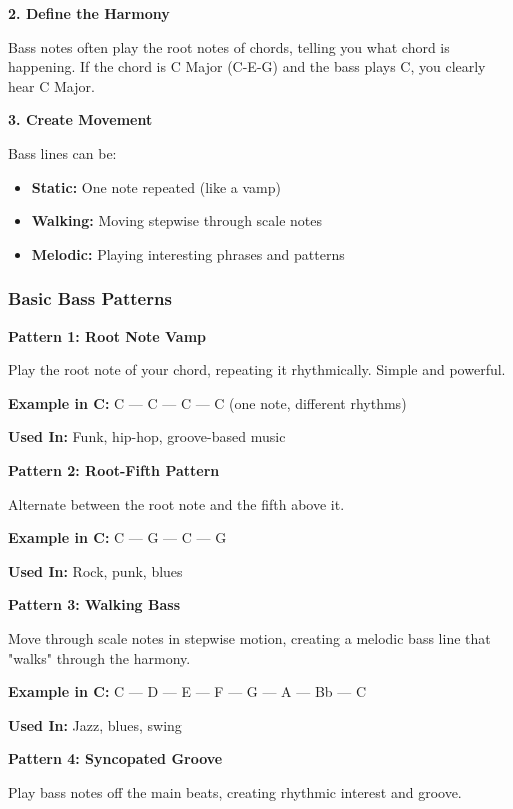 \documentclass[11pt,letterpaper]{article}
\begin{document}
\textbf{2. Define the Harmony}

Bass notes often play the root notes of chords, telling you what chord is happening. If the chord is C Major (C-E-G) and the bass plays C, you clearly hear C Major.

\textbf{3. Create Movement}

Bass lines can be:
\begin{itemize}[leftmargin=*]
\item \textbf{Static:} One note repeated (like a vamp)
\item \textbf{Walking:} Moving stepwise through scale notes
\item \textbf{Melodic:} Playing interesting phrases and patterns
\end{itemize}

\subsubsection{Basic Bass Patterns}

\textbf{Pattern 1: Root Note Vamp}

Play the root note of your chord, repeating it rhythmically. Simple and powerful.

\textbf{Example in C:} C — C — C — C (one note, different rhythms)

\textbf{Used In:} Funk, hip-hop, groove-based music

\vspace{0.5cm}

\textbf{Pattern 2: Root-Fifth Pattern}

Alternate between the root note and the fifth above it.

\textbf{Example in C:} C — G — C — G

\textbf{Used In:} Rock, punk, blues

\vspace{0.5cm}

\textbf{Pattern 3: Walking Bass}

Move through scale notes in stepwise motion, creating a melodic bass line that "walks" through the harmony.

\textbf{Example in C:} C — D — E — F — G — A — Bb — C

\textbf{Used In:} Jazz, blues, swing

\vspace{0.5cm}

\textbf{Pattern 4: Syncopated Groove}

Play bass notes off the main beats, creating rhythmic interest and groove.
\end{document}
